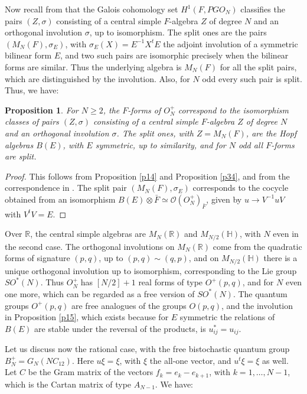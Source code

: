 \documentclass[11pt]{amsart}
\newtheorem{proposition}[theorem]{Proposition}
\theoremstyle{definition}
\begin{document}
Now recall from \cite{kmr} that the Galois cohomology set $H^1(F,PGO_N)$ classifies the pairs $(Z,\sigma)$ consisting of a central simple $F$-algebra $Z$ of degree $N$ and an orthogonal involution $\sigma$, up to isomorphism. The split ones are the pairs $(M_N(F),\sigma_E)$, with $\sigma_E(X)=E^{-1}X^tE$ the adjoint involution of a symmetric bilinear form $E$, and two such pairs are isomorphic precisely when the bilinear forms are similar. Thus the underlying algebra is $M_N(F)$ for all the split pairs, which are distinguished by the involution. Also, for $N$ odd every such pair is split. Thus, we have:

\begin{proposition}
\label{p35}
For $N\geq2$, the $F$-forms of $O_N^+$ correspond to the isomorphism classes of pairs $(Z,\sigma)$ consisting of a central simple $F$-algebra $Z$ of degree $N$ and an orthogonal involution $\sigma$. The split ones, with $Z=M_N(F)$, are the Hopf algebras $B(E)$, with $E$ symmetric, up to similarity, and for $N$ odd all $F$-forms are split.
\end{proposition}

\begin{proof}
This follows from Proposition \ref{p14} and Proposition \ref{p34}, and from the correspondence in \cite{kmr}. The split pair $(M_N(F),\sigma_E)$ corresponds to the cocycle obtained from an isomorphism $B(E)\otimes\bar F\simeq\mathcal O(O_N^+)_{\bar F}$, given by $u\to V^{-1}uV$ with $V^tV=E$.
\end{proof}

Over $\mathbb R$, the central simple algebras are $M_N(\mathbb R)$ and $M_{N/2}(\mathbb H)$, with $N$ even in the second case. The orthogonal involutions on $M_N(\mathbb R)$ come from the quadratic forms of signature $(p,q)$, up to $(p,q)\sim(q,p)$, and on $M_{N/2}(\mathbb H)$ there is a unique orthogonal involution up to isomorphism, corresponding to the Lie group $SO^*(N)$. Thus $O_N^+$ has $[N/2]+1$ real forms of type $O^+(p,q)$, and for $N$ even one more, which can be regarded as a free version of $SO^*(N)$. The quantum groups $O^+(p,q)$ are free analogues of the groups $O(p,q)$, and the involution in Proposition \ref{p15}, which exists because for $E$ symmetric the relations of $B(E)$ are stable under the reversal of the products, is $u_{ij}^*=u_{ij}$.

Let us discuss now the rational case, with the free bistochastic quantum group $B_N^+=G_N(NC_{12})$. Here $u\xi=\xi$, with $\xi$ the all-one vector, and $u^t\xi=\xi$ as well. Let $C$ be the Gram matrix of the vectors $f_k=e_k-e_{k+1}$, with $k=1,\ldots,N-1$, which is the Cartan matrix of type $A_{N-1}$. We have:
\end{document}
